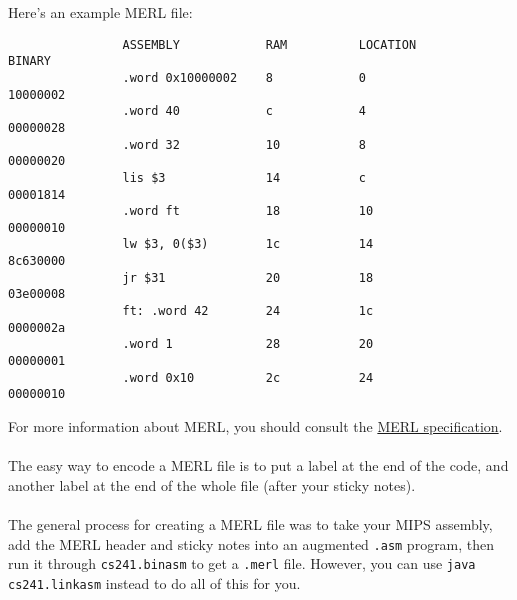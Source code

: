 \documentclass[]{article}
\theoremstyle{definition}
\newcommand{\lecture}[1]{\marginpar{{\footnotesize $\leftarrow$ \underline{#1}}}}
\begin{document}
			Here's an example MERL file:
			\begin{verbatim}
				ASSEMBLY            RAM          LOCATION          BINARY
				.word 0x10000002    8            0                 10000002
				.word 40            c            4                 00000028
				.word 32            10           8                 00000020
				lis $3              14           c                 00001814
				.word ft            18           10                00000010
				lw $3, 0($3)        1c           14                8c630000
				jr $31              20           18                03e00008
				ft: .word 42        24           1c                0000002a
				.word 1             28           20                00000001
				.word 0x10          2c           24                00000010
			\end{verbatim}
			\lecture{January 30, 2013}
			For more information about MERL, you should consult the \href{https://www.student.cs.uwaterloo.ca/~cs241/merl/merl.html}{MERL specification}.
			\\ \\
			The easy way to encode a MERL file is to put a label at the end of the code, and another label at the end of the whole file (after your sticky notes).
			\\ \\
			The general process for creating a MERL file was to take your MIPS assembly, add the MERL header and sticky notes into an augmented \verb+.asm+ program, then run it through \verb+cs241.binasm+ to get a \verb+.merl+ file. However, you can use \verb+java cs241.linkasm+ instead to do all of this for you.
\end{document}
